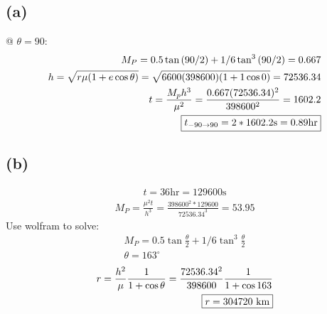 \documentclass[12 pt]{article}
\begin{document}
\subsection*{(a)}
@ $\theta=90$:
\begin{align*}
    M_P=0.5\tan{(90/2)}+1/6\tan^3{(90/2)}=0.667 \\
    h=\sqrt{r\mu(1+e\cos{\theta})}=\sqrt{6600(398600)(1+1\cos{0})}=72536.34 \\
    t=\frac{M_ph^3}{\mu^2}=\frac{0.667(72536.34)^2}{398600^2}=1602.2 \\
    \fbox{$t_{-90\rightarrow90}=2*1602.2\textrm{s}=0.89\textrm{hr}$}
\end{align*}

\subsection*{(b)}
\begin{align*}
    t=36\textrm{hr}=129600\textrm{s}
\end{align*}
\begin{align*}
    M_P=\frac{\mu^2t}{h^3}=\frac{398600^2*129600}{72536.34^3}=53.95
\end{align*}
Use wolfram to solve:
\begin{align*}
    M_P=0.5\tan{\frac{\theta}{2}}+1/6\tan^3{\frac{\theta}{2}} \\
    \theta=163^{\circ}
\end{align*}
\begin{align*}
    r=\frac{h^2}{\mu}\frac{1}{1+\cos{\theta}}=\frac{72536.34^2}{398600}\frac{1}{1+\cos{163}} \\
    \fbox{$r=304720$ km}
\end{align*}
\end{document}
